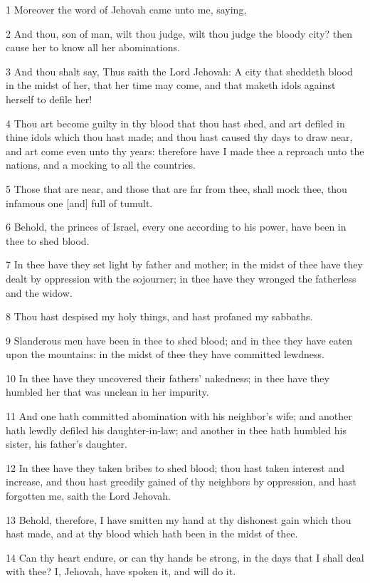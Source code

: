 \par 1 Moreover the word of Jehovah came unto me, saying,
\par 2 And thou, son of man, wilt thou judge, wilt thou judge the bloody city? then cause her to know all her abominations.
\par 3 And thou shalt say, Thus saith the Lord Jehovah: A city that sheddeth blood in the midst of her, that her time may come, and that maketh idols against herself to defile her!
\par 4 Thou art become guilty in thy blood that thou hast shed, and art defiled in thine idols which thou hast made; and thou hast caused thy days to draw near, and art come even unto thy years: therefore have I made thee a reproach unto the nations, and a mocking to all the countries.
\par 5 Those that are near, and those that are far from thee, shall mock thee, thou infamous one [and] full of tumult.
\par 6 Behold, the princes of Israel, every one according to his power, have been in thee to shed blood.
\par 7 In thee have they set light by father and mother; in the midst of thee have they dealt by oppression with the sojourner; in thee have they wronged the fatherless and the widow.
\par 8 Thou hast despised my holy things, and hast profaned my sabbaths.
\par 9 Slanderous men have been in thee to shed blood; and in thee they have eaten upon the mountains: in the midst of thee they have committed lewdness.
\par 10 In thee have they uncovered their fathers' nakedness; in thee have they humbled her that was unclean in her impurity.
\par 11 And one hath committed abomination with his neighbor's wife; and another hath lewdly defiled his daughter-in-law; and another in thee hath humbled his sister, his father's daughter.
\par 12 In thee have they taken bribes to shed blood; thou hast taken interest and increase, and thou hast greedily gained of thy neighbors by oppression, and hast forgotten me, saith the Lord Jehovah.
\par 13 Behold, therefore, I have smitten my hand at thy dishonest gain which thou hast made, and at thy blood which hath been in the midst of thee.
\par 14 Can thy heart endure, or can thy hands be strong, in the days that I shall deal with thee? I, Jehovah, have spoken it, and will do it.
